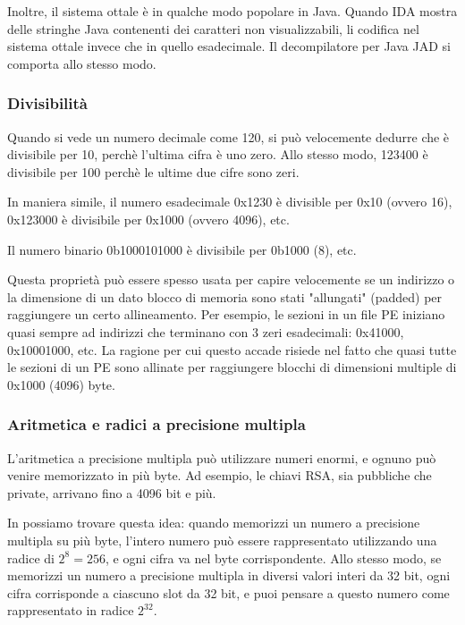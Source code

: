 Inoltre, il sistema ottale è in qualche modo popolare in Java. Quando IDA mostra delle stringhe Java contenenti dei caratteri non visualizzabili,
li codifica nel sistema ottale invece che in quello esadecimale.
Il decompilatore per Java JAD si comporta allo stesso modo.

\subsubsection{Divisibilità}

Quando si vede un numero decimale come 120, si può velocemente dedurre che è divisibile per 10, perchè l'ultima cifra è uno zero.
Allo stesso modo, 123400 è divisibile per 100 perchè le ultime due cifre sono zeri.

In maniera simile, il numero esadecimale 0x1230 è divisible per 0x10 (ovvero 16), 0x123000 è divisibile per 0x1000 (ovvero 4096), etc.

Il numero binario 0b1000101000 è divisibile per 0b1000 (8), etc.

Questa proprietà può essere spesso usata per capire velocemente se un indirizzo o la dimensione di un dato blocco di memoria sono stati "allungati" (padded) per raggiungere un certo allineamento.
Per esempio, le sezioni in un file \ac{PE} iniziano quasi sempre ad indirizzi che terminano con 3 zeri esadecimali: 0x41000, 0x10001000, etc.
La ragione per cui questo accade risiede nel fatto che quasi tutte le sezioni di un \ac{PE} sono allinate per raggiungere blocchi di dimensioni multiple di 0x1000 (4096) byte.

\subsubsection{Aritmetica e radici a precisione multipla}

L'aritmetica a precisione multipla può utilizzare numeri enormi, e ognuno può venire memorizzato in più byte.
Ad esempio, le chiavi RSA, sia pubbliche che private, arrivano fino a 4096 bit e più.

In  possiamo trovare questa idea: quando memorizzi un numero a precisione multipla su più byte,
l'intero numero può essere rappresentato utilizzando una radice di $2^8=256$, e ogni cifra va nel byte corrispondente.
Allo stesso modo, se memorizzi un numero a precisione multipla in diversi valori interi da 32 bit, ogni cifra corrisponde a ciascuno slot da 32 bit,
e puoi pensare a questo numero come rappresentato in radice $2^{32}$.

